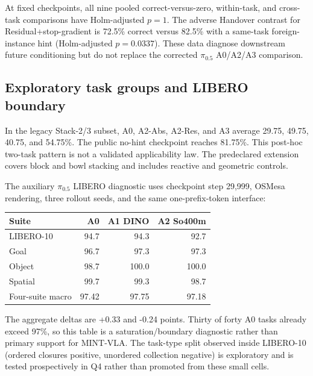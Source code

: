 At fixed checkpoints, all nine pooled correct-versus-zero, within-task, and
cross-task comparisons have Holm-adjusted $p{=}1$.  The adverse Handover
contrast for Residual+stop-gradient is 72.5\% correct versus 82.5\% with a
same-task foreign-instance hint (Holm-adjusted $p{=}0.0337$).  These data
diagnose downstream future conditioning but do not replace the corrected
$\pi_{0.5}$ A0/A2/A3 comparison.

\subsection{Exploratory task groups and LIBERO boundary}
In the legacy Stack-2/3 subset, A0, A2-Abs, A2-Res, and A3 average 29.75, 49.75,
40.75, and 54.75\%.  The public no-hint checkpoint reaches 81.75\%.  This
post-hoc two-task pattern is not a validated applicability law.  The
predeclared extension covers block and bowl stacking and includes reactive and
geometric controls.

The auxiliary $\pi_{0.5}$ LIBERO diagnostic uses checkpoint step 29,999,
OSMesa rendering, three rollout seeds, and the same one-prefix-token interface:
\begin{center}\small
\begin{tabular}{lrrr}
\toprule
Suite & A0 & A1 DINO & A2 So400m \\
\midrule
LIBERO-10 & 94.7 & 94.3 & 92.7 \\
Goal & 96.7 & 97.3 & 97.3 \\
Object & 98.7 & 100.0 & 100.0 \\
Spatial & 99.7 & 99.3 & 98.7 \\
\midrule
Four-suite macro & 97.42 & 97.75 & 97.18 \\
\bottomrule
\end{tabular}
\end{center}
The aggregate deltas are +0.33 and -0.24 points.  Thirty of forty A0 tasks
already exceed 97\%, so this table is a saturation/boundary diagnostic rather
than primary support for MINT-VLA.  The task-type split observed inside LIBERO-10
(ordered closures positive, unordered collection negative) is exploratory and
is tested prospectively in Q4 rather than promoted from these small cells.


